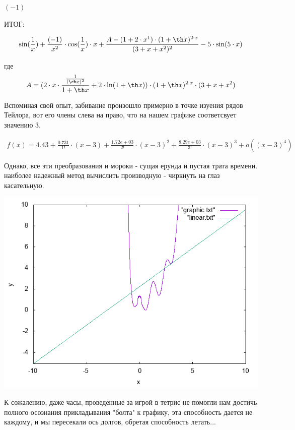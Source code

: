 \documentclass[a4paper,12pt]{article}
\begin{document}
\begin{center}$(-1)$

\end{center}

ИТОГ:

\begin{equation} \sin ( \frac{1}{x} )+ \frac{(-1)}{x^{2}}  \cdot  \cos ( \frac{1}{x} ) \cdot x+ \frac{A-(1+2 \cdot x^{1}) \cdot (1+ \th x)^{2 \cdot x}}{(3+x+x^{2})^{2}} -5 \cdot  \sin (5 \cdot x)\end{equation}

где\begin{align*} A =(2 \cdot x \cdot  \frac{ \frac{1}{( \ch x)^{2}} }{1+ \th x} +2 \cdot  \ln (1+ \th x)) \cdot (1+ \th x)^{2 \cdot x} \cdot (3+x+x^{2})\end{align*}



Вспоминая свой опыт, забивание произошло примерно в точке изуения рядов Тейлора, вот его члены слева на право, что на нашем графике соответсвует значению 3.

 \begin{align*}f(x) = 4.43 + \frac{0.731}{1!} \cdot (x - 3) + \frac{1.72e+03}{2!} \cdot (x - 3)^{2} + \frac{8.29e+03}{3!} \cdot (x - 3)^{3} + o((x - 3)^{4})\end{align*}

Однако, все эти преобразования и мороки - сущая ерунда и пустая трата времени. наиболее надежный метод вычислить производную - чиркнуть на глаз касательную.

\includegraphics{graphic.png}

К сожалению, даже часы, проведенные за игрой в тетрис не помогли нам достичь полного осознания прикладывания "болта" к графику, эта способность дается не каждому, и мы пересекали ось долгов, обретая способность летать...
\end{document}
